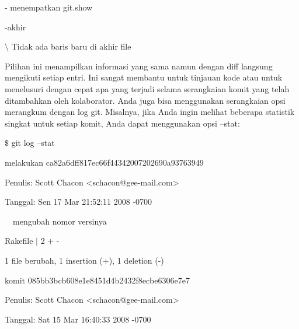 \noindent 
 \hspace*{0.5in} - menempatkan git.show \par
\noindent 
 \hspace*{0.5in} -akhir \par
\noindent 
 \hspace*{0.5in}  $  \setminus  $ Tidak ada baris baru di akhir file \par
 \vspace{\baselineskip}
\noindent 
 \hspace*{0.5in} Pilihan ini menampilkan informasi yang sama namun dengan diff langsung mengikuti setiap entri. Ini sangat membantu untuk tinjauan kode atau untuk menelusuri dengan cepat apa yang terjadi selama serangkaian komit yang telah ditambahkan oleh kolaborator. Anda juga bisa menggunakan serangkaian opsi merangkum dengan log git. Misalnya, jika Anda ingin melihat beberapa statistik singkat untuk setiap komit, Anda dapat menggunakan opsi --stat: \par
 \vspace{\baselineskip}
\noindent 
 \hspace*{0.5in}  $  \$  $ git log --stat \par
\noindent 
 \hspace*{0.5in} melakukan ca82a6dff817ec66f44342007202690a93763949 \par
\noindent 
 \hspace*{0.5in} Penulis: Scott Chacon <schacon@gee-mail.com> \par
\noindent 
 \hspace*{0.5in} Tanggal: Sen 17 Mar 21:52:11 2008 -0700 \par
 \vspace{\baselineskip}
\noindent 
 \hspace*{0.5in}  $  $ $  $ $  $ $  $mengubah nomor versinya \par
\noindent 
 \hspace*{0.5in}  $  $Rakefile  $  \vert  $ 2 + - \par
\noindent 
 \hspace*{0.5in}  $  $1 file berubah, 1 insertion (+), 1 deletion (-) \par
\noindent 
 \hspace*{0.5in} komit 085bb3bcb608e1e8451d4b2432f8ecbe6306e7e7 \par
\noindent 
 \hspace*{0.5in} Penulis: Scott Chacon <schacon@gee-mail.com> \par
\noindent 
 \hspace*{0.5in} Tanggal: Sat 15 Mar 16:40:33 2008 -0700 \par
